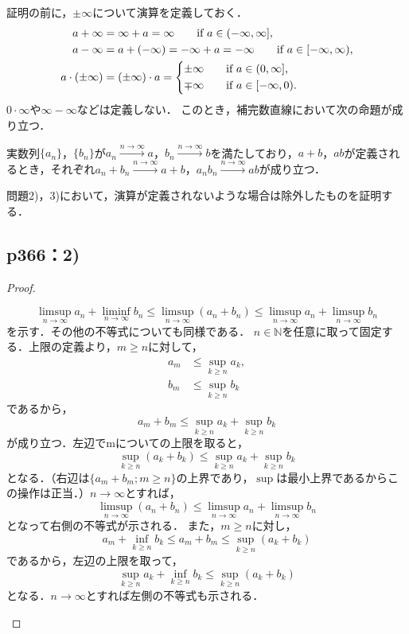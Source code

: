 \documentclass[a4paper,10pt,fleqn]{ltjsarticle}
\begin{document}
  証明の前に，$\pm \infty$について演算を定義しておく．
  \begin{align*}
    a + \infty &= \infty + a = \infty \qquad \text{if $a \in (-\infty,\infty]$}, \\
    a - \infty &= a + (-\infty) = -\infty + a = -\infty \qquad \text{if $a \in [-\infty,\infty)$}, \\
    a \cdot (\pm \infty) &= (\pm \infty) \cdot a =
    \begin{cases*}
      \pm \infty \quad & if $a \in (0,\infty]$, \\
      \mp \infty \quad & if $a \in [-\infty,0)$.
    \end{cases*}
  \end{align*}
  $0 \cdot \infty$や$\infty - \infty$などは定義しない．
  このとき，補完数直線において次の命題が成り立つ．
  \begin{lemm*}
    実数列$\{a_n\}$，$\{b_n\}$が$a_n \xrightarrow{n \to \infty} a$，$b_n \xrightarrow{n \to \infty} b$を満たしており，$a+b$，$ab$が定義されるとき，それぞれ$a_n + b_n \xrightarrow{n \to \infty} a+b$，$a_n b_n \xrightarrow{n \to \infty} ab$が成り立つ．
  \end{lemm*}
  問題2)，3)において，演算が定義されないような場合は除外したものを証明する．
  

  \subsection*{p366：2)}

  \begin{proof}
    \begin{leftbar}
      \[
        \limsup _{n \to \infty} a_n + \liminf _{n \to \infty} b_n \leq \limsup _{n \to \infty} (a_n + b_n) \leq \limsup _{n \to \infty} a_n + \limsup _{n \to \infty} b_n
      \]
      を示す．その他の不等式についても同様である．
      $n \in \mathbb{N}$を任意に取って固定する．上限の定義より，$m \geq n$に対して，
      \begin{align*}
        a_m &\leq \sup _{k \geq n} a_k, \\
        b_m &\leq \sup _{k \geq n} b_k
      \end{align*}
      であるから，
      \[
        a_m + b_m \leq \sup _{k \geq n} a_k + \sup _{k \geq n} b_k
      \]
      が成り立つ．左辺でmについての上限を取ると，
      \[
        \sup _{k \geq n} (a_k + b_k) \leq \sup _{k \geq n} a_k + \sup _{k \geq n} b_k
      \]
      となる．（右辺は$\{a_m + b_m; m \geq n\}$の上界であり，$\sup$は最小上界であるからこの操作は正当．）$n \to \infty$とすれば，
      \[
        \limsup _{n \to \infty} (a_n + b_n) \leq \limsup _{n \to \infty} a_n + \limsup _{n \to \infty} b_n
      \]
      となって右側の不等式が示される．
      また，$m \geq n$に対し，
      \[
        a_m + \inf _{k \geq n} b_k \leq a_m + b_m \leq \sup _{k \geq n} (a_k + b_k)
      \]
      であるから，左辺の上限を取って，
      \[
        \sup _{k \geq n} a_k + \inf _{k \geq n} b_k \leq \sup _{k \geq n} (a_k + b_k)
      \]
      となる．$n \to \infty$とすれば左側の不等式も示される．
    \end{leftbar}
  \end{proof}
\end{document}
